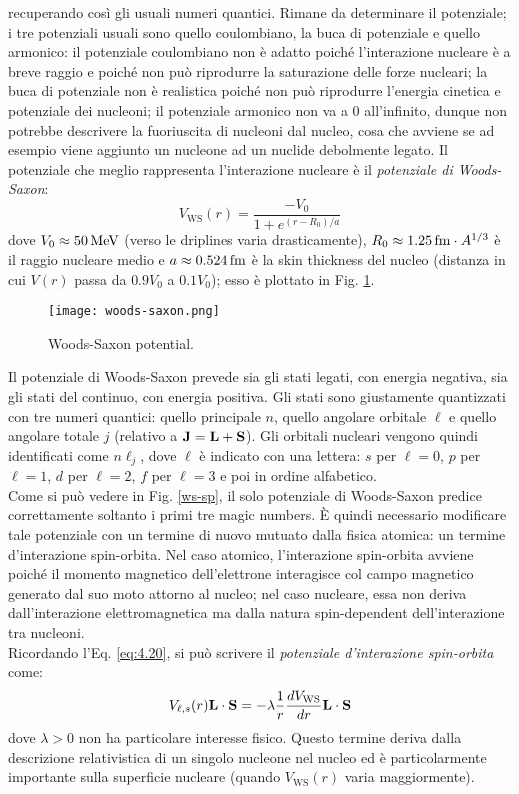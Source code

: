 recuperando così gli usuali numeri quantici. Rimane da determinare il potenziale; i tre potenziali usuali sono quello coulombiano, la buca di potenziale e quello armonico: il potenziale coulombiano non è adatto poiché l'interazione nucleare è a breve raggio e poiché non può riprodurre la saturazione delle forze nucleari; la buca di potenziale non è realistica poiché non può riprodurre l'energia cinetica e potenziale dei nucleoni; il potenziale armonico non va a 0 all'infinito, dunque non potrebbe descrivere la fuoriuscita di nucleoni dal nucleo, cosa che avviene se ad esempio viene aggiunto un nucleone ad un nuclide debolmente legato. Il potenziale che meglio rappresenta l'interazione nucleare è il \textit{potenziale di Woods-Saxon}:
\begin{equation}
	V_{\text{WS}}(r) = \frac{-V_0}{1 + e^{(r - R_0) / a}}
	\label{eq:5.4}
\end{equation}
dove $ V_0 \approx 50\,\mathrm{MeV} $ (verso le driplines varia drasticamente), $ R_0 \approx 1.25\,\mathrm{fm} \cdot A^{1/3} $ è il raggio nucleare medio e $ a \approx 0.524\,\mathrm{fm} $ è la skin thickness del nucleo (distanza in cui $ V(r) $ passa da $ 0.9 V_0 $ a $ 0.1 V_0 $); esso è plottato in Fig. \ref{woods-saxon}.

\begin{figure}[!b]
	\centering
	\texttt{[image: woods-saxon.png]}
	\caption{Woods-Saxon potential.}
	\label{woods-saxon}
\end{figure}

Il potenziale di Woods-Saxon prevede sia gli stati legati, con energia negativa, sia gli stati del continuo, con energia positiva. Gli stati sono giustamente quantizzati con tre numeri quantici: quello principale $ n $, quello angolare orbitale $ \ell $ e quello angolare totale $ j $ (relativo a $ \mathbf{J} = \mathbf{L} + \mathbf{S} $). Gli orbitali nucleari vengono quindi identificati come $ n\ell_j $, dove $ \ell $ è indicato con una lettera: $ s $ per $ \ell = 0 $, $ p $ per $ \ell = 1 $, $ d $ per $ \ell = 2 $, $ f $ per $ \ell = 3 $ e poi in ordine alfabetico.\\
Come si può vedere in Fig. \ref{ws-sp}, il solo potenziale di Woods-Saxon predice correttamente soltanto i primi tre magic numbers. È quindi necessario modificare tale potenziale con un termine di nuovo mutuato dalla fisica atomica: un termine d'interazione spin-orbita. Nel caso atomico, l'interazione spin-orbita avviene poiché il momento magnetico dell'elettrone interagisce col campo magnetico generato dal suo moto attorno al nucleo; nel caso nucleare, essa non deriva dall'interazione elettromagnetica ma dalla natura spin-dependent dell'interazione tra nucleoni.\\
Ricordando l'Eq. \ref{eq:4.20}, si può scrivere il \textit{potenziale d'interazione spin-orbita} come:
\begin{equation}
	V_{\ell,s}(r) \mathbf{L}\cdot\mathbf{S} = - \lambda \frac{1}{r} \frac{dV_{\text{WS}}}{dr} \mathbf{L}\cdot\mathbf{S}
	\label{eq:5.5}
\end{equation}
dove $ \lambda > 0 $ non ha particolare interesse fisico. Questo termine deriva dalla descrizione relativistica di un singolo nucleone nel nucleo ed è particolarmente importante sulla superficie nucleare (quando $ V_{\text{WS}}(r) $ varia maggiormente).

